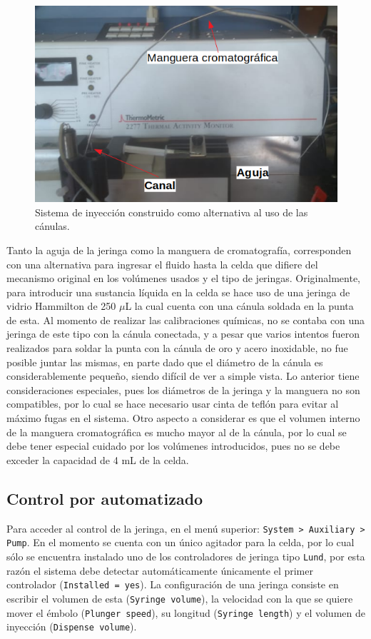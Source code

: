 	\begin{figure}[h]
		\centering
		\includegraphics[width=0.6\linewidth]{Figures/sistemaInyeccion}
		
		\caption{Sistema de inyección construido como alternativa al uso de las cánulas.}
		\label{fig: sistemaInyeccion}
	\end{figure}
	
	Tanto la aguja de la jeringa como la manguera de cromatografía, corresponden con una alternativa para ingresar el fluido hasta la celda que difiere del mecanismo original en los volúmenes usados y el tipo de jeringas. Originalmente, para introducir una sustancia l\'iquida en la celda se hace uso de una jeringa de vidrio Hammilton de 250 $\mu$L la cual cuenta con una cánula soldada en la punta de esta. Al momento de realizar las calibraciones qu\'imicas, no se contaba con una jeringa de este tipo con la cánula conectada, y a pesar que varios intentos fueron realizados para soldar la punta con la cánula de oro y acero inoxidable, no fue posible juntar las mismas, en parte dado que el diámetro de la cánula es considerablemente pequeño, siendo difícil de ver a simple vista. Lo anterior tiene consideraciones especiales, pues los diámetros de la jeringa y la manguera no son compatibles, por lo cual se hace necesario usar cinta de teflón para evitar al máximo fugas en el sistema. Otro aspecto a considerar es que el volumen interno de la manguera cromatogr\'afica es mucho mayor al de la cánula, por lo cual se debe tener especial cuidado por los volúmenes introducidos, pues no se debe exceder la capacidad de 4 mL de la celda.
	
	\subsection{Control por automatizado}\label{ssec: jeringa}
	Para acceder al control de la jeringa, en el menú superior: \texttt{System > Auxiliary > Pump}. En el momento se cuenta con un único agitador para la celda, por lo cual sólo se encuentra instalado uno de los controladores de jeringa tipo \texttt{Lund}, por esta razón el sistema debe detectar automáticamente únicamente el primer controlador (\texttt{Installed = yes}). La configuración de una jeringa consiste en escribir el volumen de esta (\texttt{Syringe volume}), la velocidad con la que se quiere mover el émbolo (\texttt{Plunger speed}), su longitud (\texttt{Syringe length}) y el volumen de inyección (\texttt{Dispense volume}).
	
